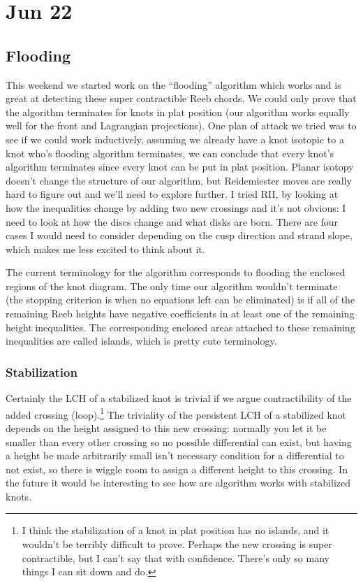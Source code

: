 \documentclass[11pt,oneside]{amsart}
\begin{document}
\rhead{\rightmark \today}
\tableofcontents
\newpage

\section{Jun 22}
\subsection{Flooding} This weekend we started work on the ``flooding'' algorithm which works and is great at detecting these super contractible Reeb chords. We could only prove that the algorithm terminates for knots in plat position (our algorithm works equally well for the front and Lagrangian projections). One plan of attack we tried was to see if we could work inductively, assuming we already have a knot isotopic to a knot who's flooding algorithm terminates, we can conclude that every knot's algorithm terminates since every knot can be put in plat position. Planar isotopy doesn't change the structure of our algorithm, but Reidemiester moves are really hard to figure out and we'll need to explore further. I tried RII, by looking at how the inequalities change by adding two new crossings and it's not obvious: I need to look at how the discs change and what disks are born. There are four cases I would need to consider depending on the cusp direction and strand slope, which makes me less excited to think about it.

The current terminology for the algorithm corresponds to flooding the enclosed regions of the knot diagram. The only time our algorithm wouldn't terminate (the stopping criterion is when no equations left can be eliminated) is if all of the remaining Reeb heights have negative coefficients in at least one of the remaining height inequalities. The corresponding enclosed areas attached to these remaining inequalities are called islands, which is pretty cute terminology.

\subsubsection{Stabilization} Certainly the LCH of a stabilized knot is trivial if we argue contractibility of the added crossing (loop).\footnote{I think the stabilization of a knot in plat position has no islands, and it wouldn't be terribly difficult to prove. Perhaps the new crossing is super contractible, but I can't say that with confidence. There's only so many things I can sit down and do.} The triviality of the persistent LCH of a stabilized knot depends on the height assigned to this new crossing: normally you let it be smaller than every other crossing so no possible differential can exist, but having a height be made arbitrarily small isn't necessary condition for a differential to not exist, so there is wiggle room to assign a different height to this crossing. In the future it would be interesting to see how are algorithm works with stabilized knots.
\end{document}
